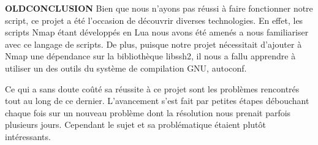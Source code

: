 \documentclass[frenchb]{article}
\begin{document}
{\Large\textbf{OLDCONCLUSION}}
Bien que nous n'ayons pas réussi à faire fonctionner notre script, ce projet a été l'occasion de découvrir diverses technologies. En effet, les scripts Nmap étant développés en Lua nous avons été amenés a nous familiariser avec ce langage de scripts. De plus, puisque notre projet nécessitait d'ajouter à Nmap une dépendance sur la bibliothèque \textsf{libssh2}, il nous a fallu apprendre à utiliser un des outils du système de compilation GNU, \textsf{autoconf}. 

Ce qui a sans doute coûté sa réussite à ce projet sont les problèmes rencontrés tout au long de ce dernier. L'avancement s'est fait par petites étapes débouchant chaque fois sur un nouveau problème dont la résolution nous prenait parfois plusieurs jours. Cependant le sujet et sa problématique étaient plutôt intéressants.
\end{document}
